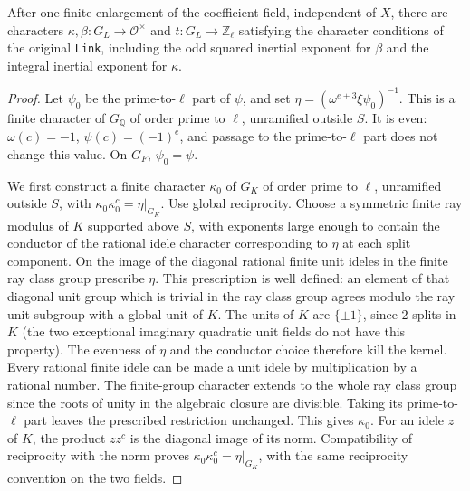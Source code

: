 \begin{lemma}
\label{lem:rh-four-link-characters}
After one finite enlargement of the coefficient field, independent
of $X$, there are characters $\kappa,\beta:G_L\to\mathcal O^\times$
and $t:G_L\to\mathbb Z_\ell$ satisfying the character conditions
of the original \texttt{Link}, including the odd squared inertial
exponent for $\beta$ and the integral inertial exponent for $\kappa$.
\end{lemma}
\begin{proof}
Let $\psi_0$ be the prime-to-$\ell$ part of $\psi$, and set
$\eta=(\omega^{e+3}\xi\psi_0)^{-1}$. This is a finite character
of $G_{\mathbb Q}$ of order prime to $\ell$, unramified outside $S$.
It is even: $\omega(c)=-1$, $\psi(c)=(-1)^e$, and passage to the
prime-to-$\ell$ part does not change this value. On $G_F$,
$\psi_0=\psi$.

We first construct a finite character $\kappa_0$ of $G_K$ of order
prime to $\ell$, unramified outside $S$, with
$\kappa_0\kappa_0^c=\eta|_{G_K}$. Use global reciprocity. Choose
a symmetric finite ray modulus of $K$ supported above $S$,
with exponents large enough to contain the conductor of the
rational idele character corresponding to $\eta$ at each split
component. On the image of the diagonal rational finite unit
ideles in the finite ray class group prescribe $\eta$. This
prescription is well defined: an element of that diagonal unit
group which is trivial in the ray class group agrees modulo the
ray unit subgroup with a global unit of $K$. The units of $K$
are $\{\pm1\}$, since $2$ splits in $K$ (the two exceptional
imaginary quadratic unit fields do not have this property).
The evenness of $\eta$ and the conductor choice therefore kill
the kernel. Every rational finite idele can be made a unit idele
by multiplication by a rational number. The finite-group character
extends to the whole ray class group since the roots of unity
in the algebraic closure are divisible. Taking its prime-to-$\ell$
part leaves the prescribed restriction unchanged. This gives
$\kappa_0$. For an idele $z$ of $K$, the product $zz^c$ is the
diagonal image of its norm. Compatibility of reciprocity with the
norm proves $\kappa_0\kappa_0^c=\eta|_{G_K}$, with the same
reciprocity convention on the two fields.


\end{proof}
